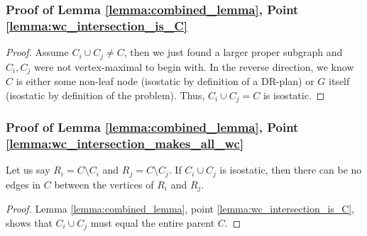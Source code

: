 




\subsubsection{Proof of Lemma \ref{lemma:combined_lemma}, Point \ref{lemma:wc_intersection_is_C}}

\begin{proof}
Assume $C_i\cup C_j \neq C$, then we just found a larger proper subgraph and $C_i,C_j$ were not vertex-maximal to begin with.
%
In the reverse direction, we know $C$ is either some non-leaf node (isostatic by definition of a DR-plan) or $G$ itself (isostatic by definition of the problem). Thus, $C_i\cup C_j=C$ is isostatic.
\end{proof}


\subsubsection{Proof of Lemma \ref{lemma:combined_lemma}, Point \ref{lemma:wc_intersection_makes_all_wc}}

\begin{observation}\label{observation:no_edges_between_diff}
Let us say $R_i=C\setminus C_i$ and $R_j=C\setminus C_j$. If $C_i\cup C_j$ is isostatic, then there can be no edges in $C$ between the vertices of $R_i$ and $R_j$.
\end{observation}

\begin{proof}
Lemma \ref{lemma:combined_lemma}, point \ref{lemma:wc_intersection_is_C}, shows that $C_i\cup C_j$ must equal the entire parent $C$.
\end{proof}


